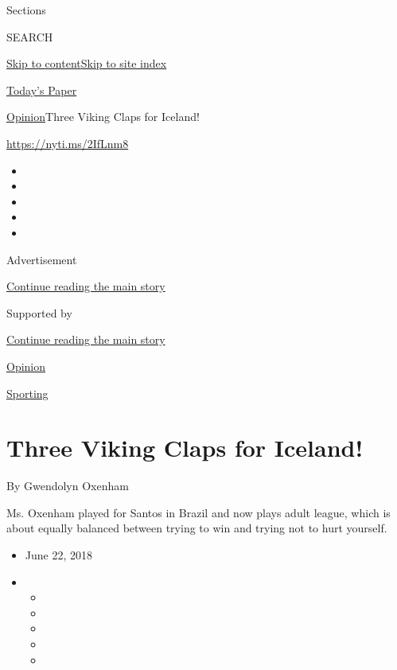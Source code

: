 Sections

SEARCH

\protect\hyperlink{site-content}{Skip to
content}\protect\hyperlink{site-index}{Skip to site index}

\href{https://myaccount.nytimes3xbfgragh.onion/auth/login?response_type=cookie\&client_id=vi}{}

\href{https://www.nytimes3xbfgragh.onion/section/todayspaper}{Today's
Paper}

\href{/section/opinion}{Opinion}\textbar{}Three Viking Claps for
Iceland!

\url{https://nyti.ms/2IfLnm8}

\begin{itemize}
\item
\item
\item
\item
\item
\end{itemize}

Advertisement

\protect\hyperlink{after-top}{Continue reading the main story}

Supported by

\protect\hyperlink{after-sponsor}{Continue reading the main story}

\href{/section/opinion}{Opinion}

\href{/column/sporting}{Sporting}

\hypertarget{three-viking-claps-for-iceland}{%
\section{Three Viking Claps for
Iceland!}\label{three-viking-claps-for-iceland}}

By Gwendolyn Oxenham

Ms. Oxenham played for Santos in Brazil and now plays adult league,
which is about equally balanced between trying to win and trying not to
hurt yourself.

\begin{itemize}
\item
  June 22, 2018
\item
  \begin{itemize}
  \item
  \item
  \item
  \item
  \item
  \end{itemize}
\end{itemize}

